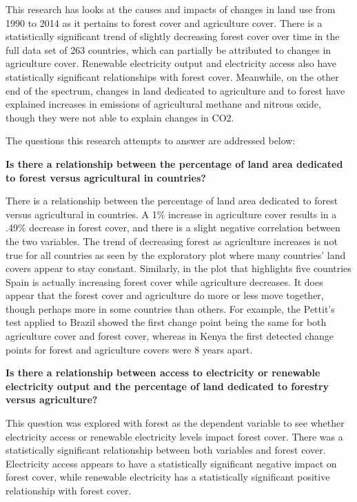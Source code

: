 \documentclass[12pt,]{article}
\begin{document}
This research has looks at the causes and impacts of changes in land use
from 1990 to 2014 as it pertains to forest cover and agriculture cover.
There is a statistically significant trend of slightly decreasing forest
cover over time in the full data set of 263 countries, which can
partially be attributed to changes in agriculture cover. Renewable
electricity output and electricity access also have statistically
significant relationships with forest cover. Meanwhile, on the other end
of the spectrum, changes in land dedicated to agriculture and to forest
have explained increases in emissions of agricultural methane and
nitrous oxide, though they were not able to explain changes in CO2.

The questions this research attempts to answer are addressed below:

\textbf{Is there a relationship between the percentage of land area
dedicated to forest versus agricultural in countries?}

There is a relationship between the percentage of land area dedicated to
forest versus agricultural in countries. A 1\% increase in agriculture
cover results in a .49\% decrease in forest cover, and there is a slight
negative correlation between the two variables. The trend of decreasing
forest as agriculture increases is not true for all countries as seen by
the exploratory plot where many countries' land covers appear to stay
constant. Similarly, in the plot that highlights five countries Spain is
actually increasing forest cover while agriculture decreases. It does
appear that the forest cover and agriculture do more or less move
together, though perhaps more in some countries than others. For
example, the Pettit's test applied to Brazil showed the first change
point being the same for both agriculture cover and forest cover,
whereas in Kenya the first detected change points for forest and
agriculture covers were 8 years apart.

\textbf{Is there a relationship between access to electricity or
renewable electricity output and the percentage of land dedicated to
forestry versus agriculture?}

This question was explored with forest as the dependent variable to see
whether electricity access or renewable electricity levels impact forest
cover. There was a statistically significant relationship between both
variables and forest cover. Electricity access appears to have a
statistically significant negative impact on forest cover, while
renewable electricity has a statistically significant positive
relationship with forest cover.
\end{document}
